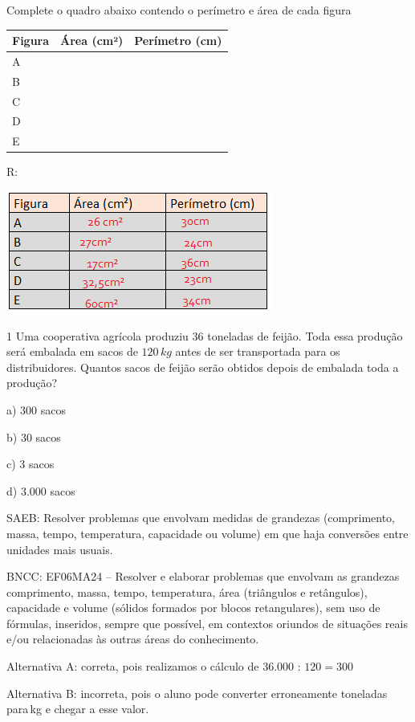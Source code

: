 Complete o quadro abaixo contendo o perímetro e área de cada figura


\begin{longtable}[]{@{}lll@{}}
\toprule
Figura & Área (cm²) & Perímetro (cm)\tabularnewline
\midrule
\endhead
A & ~ & ~\tabularnewline
B & ~ & ~\tabularnewline
C & ~ & ~\tabularnewline
D & ~ & ~\tabularnewline
E & ~ & ~\tabularnewline
\bottomrule
\end{longtable}

R:

\includegraphics[width=3.44792in,height=1.58333in]{./imgSAEB_6_MAT/media/image99.png}


\num{1}  Uma cooperativa agrícola produziu $36$ toneladas de feijão. Toda essa
produção será embalada em sacos de $120\,kg$ antes de ser transportada para
os distribuidores. Quantos sacos de feijão serão obtidos depois de
embalada toda a produção?

a) $300$ sacos

b) $30$ sacos

c) $3$ sacos

d) $3.000$ sacos

SAEB: Resolver problemas que envolvam medidas de grandezas (comprimento,
massa, tempo, temperatura, capacidade ou volume) em que haja conversões
entre unidades mais usuais.

BNCC: EF06MA24 -- Resolver e elaborar problemas que envolvam as
grandezas comprimento, massa, tempo, temperatura, área (triângulos e
retângulos), capacidade e volume (sólidos formados por blocos
retangulares), sem uso de fórmulas, inseridos, sempre que possível, em
contextos oriundos de situações reais e/ou relacionadas às outras áreas
do conhecimento.

Alternativa A: correta, pois realizamos o cálculo de $36.000$ : $120 = 300$

Alternativa B: incorreta, pois o aluno pode converter erroneamente
toneladas para\,kg e chegar a esse valor.

